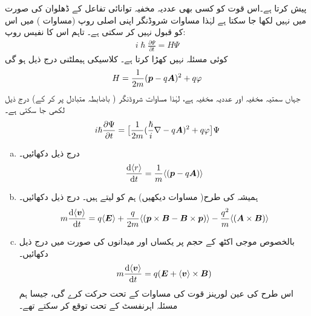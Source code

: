  پیش کرتا ہے۔اس قوت کو کسی بھی عددیہ مخفیہ توانائی تفاعل کے ڈھلوان کی صورت میں نہیں لکھا جا سکتا ہے لہٰذا مساوات شروڈنگر اپنی اصلی روپ (مساوات ) میں اس کو قبول نہیں کر سکتی ہے۔ تاہم اس کا نفیس روپ:
\begin{align}
 i\hslash\frac{\partial\Psi}{\partial t}=H\Psi
\end{align}
کوئی مسئلہ نہیں کھڑا کرتا ہے۔ کلاسیکی ہیملٹنی درج ذیل ہو گی
\begin{align}
 H=\frac{1}{2m}({{\boldsymbol{p}}}-q{{\boldsymbol{A}}})^2+q\varphi
\end{align}
 جہاں  سمتیہ مخفیہ  اور
  عددیہ مخفیہ  ہے، لہٰذا مساوات شروڈنگر 
 ( باضابطہ متبادل  پر کر کے) درج ذیل لکھی جا سکتی ہے۔
\begin{align}\label{مساوات_تین_ابعادی_شروڈنگر_باضابطہ}
 i\hslash\frac{\partial\Psi}{\partial t}=\big [\frac{1}{2m}(\frac{\hslash}{i}\nabla-q{{\boldsymbol{A}}})^2+q\varphi\big ]\Psi
\end{align}
\begin{enumerate}[a.]
\item 
درج ذیل دکھائیں۔
 \begin{align}\label{مساوات_تین_ابعاد_رفتار_توقعاتی_تعلق}
 \frac{\dif\, \langle r \rangle }{\dif t}=\frac{1}{m}\langle(\kvec{p}-q\kvec{A})\rangle
\end{align}
\item
 ہمیشہ کی طرح( مساوات  دیکھیں) ہم  کو  لیتے ہیں۔ درج ذیل دکھائیں۔
\begin{align}
 m\frac{\dif \, \langle \kvec{v} \rangle}{\dif t}=q\langle\kvec{E}\rangle+\frac{q}{2m}\langle(\kvec{p}\times\kvec{B}-\kvec{B}\times\kvec{p})\rangle-\frac{q^2}{m} \langle (\kvec{A}\times\kvec{B})\rangle
\end{align}
\item 
 بالخصوص موجی اکٹھ کے حجم پر یکساں  اور  میدانوں کی صورت میں درج ذیل دکھائیں۔
 \begin{align}
 m\frac{\dif\, \langle \kvec{v}\rangle}{\dif t}=q(\kvec{E}+\langle\kvec{v}\rangle\times\kvec{B})
\end{align}
 اس طرح  کی عین لورینز قوت کی مساوات کے تحت حرکت کرے گی، جیسا ہم مسئلہ اہرنفسٹ کے تحت توقع کر سکتے تھے۔
\end{enumerate}
